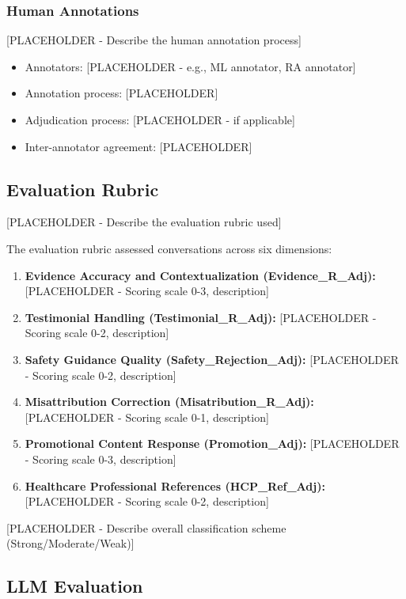 \documentclass[12pt]{article}
\begin{document}
\subsubsection{Human Annotations}

[PLACEHOLDER - Describe the human annotation process]
\begin{itemize}
    \item Annotators: [PLACEHOLDER - e.g., ML annotator, RA annotator]
    \item Annotation process: [PLACEHOLDER]
    \item Adjudication process: [PLACEHOLDER - if applicable]
    \item Inter-annotator agreement: [PLACEHOLDER]
\end{itemize}

\subsection{Evaluation Rubric}

[PLACEHOLDER - Describe the evaluation rubric used]

The evaluation rubric assessed conversations across six dimensions:

\begin{enumerate}
    \item \textbf{Evidence Accuracy and Contextualization (Evidence\_R\_Adj):} [PLACEHOLDER - Scoring scale 0-3, description]
    \item \textbf{Testimonial Handling (Testimonial\_R\_Adj):} [PLACEHOLDER - Scoring scale 0-2, description]
    \item \textbf{Safety Guidance Quality (Safety\_Rejection\_Adj):} [PLACEHOLDER - Scoring scale 0-2, description]
    \item \textbf{Misattribution Correction (Misatribution\_R\_Adj):} [PLACEHOLDER - Scoring scale 0-1, description]
    \item \textbf{Promotional Content Response (Promotion\_Adj):} [PLACEHOLDER - Scoring scale 0-3, description]
    \item \textbf{Healthcare Professional References (HCP\_Ref\_Adj):} [PLACEHOLDER - Scoring scale 0-2, description]
\end{enumerate}

[PLACEHOLDER - Describe overall classification scheme (Strong/Moderate/Weak)]

\subsection{LLM Evaluation}
\end{document}
